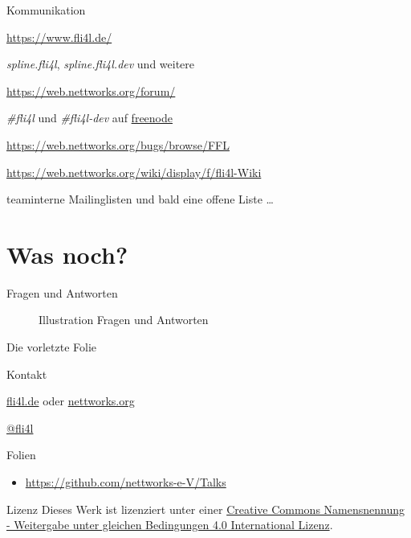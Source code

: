 \documentclass[t]{beamer}
\begin{document}
\begin{frame}{Kommunikation}
    \begin{description}[Newsgroups]
        \item[WWW] \url{https://www.fli4l.de/}
        \item[Newsgroups] \emph{spline.fli4l}, \emph{spline.fli4l.dev}
            und weitere
        \item[Forum] \url{https://web.nettworks.org/forum/}
        \item[IRC] \emph{\#fli4l} und \emph{\#fli4l-dev} auf
            \href{https://freenode.net/}{freenode}
        \item[Bugtracker] \url{https://web.nettworks.org/bugs/browse/FFL}
        \item[Wiki] \small
            \url{https://web.nettworks.org/wiki/display/f/fli4l-Wiki}
            \normalsize
        \item[E-Mail] teaminterne Mailinglisten und bald eine offene Liste …
    \end{description}
\end{frame}

\section*{Was noch?}

\begin{frame}{Fragen und Antworten}
    \begin{figure}
        
        \caption{Illustration Fragen und Antworten}
    \end{figure}
\end{frame}

\begin{frame}{Die vorletzte Folie}
    \begin{figure}
        
    \end{figure}
    \begin{block}{Kontakt}
        \begin{description}[Twitter]
            \item [WWW] \href{https://www.fli4l.de/}{fli4l.de} oder
                    \href{https://www.nettworks.org/}{nettworks.org}
            \item [Twitter] \href{https://twitter.com/fli4l}{@fli4l}
        \end{description}
    \end{block}
    \begin{block}{Folien}
        \begin{itemize}
            \item \url{https://github.com/nettworks-e-V/Talks}
        \end{itemize}
    \end{block}
    \begin{block}{Lizenz}
        \small{%
            Dieses Werk ist lizenziert unter einer
            \href{http://creativecommons.org/licenses/by-sa/4.0/}{Creative Commons
            Namensnennung - Weitergabe unter gleichen Bedingungen 4.0 International
            Lizenz}.
        }
    \end{block}
\end{frame}
\end{document}
